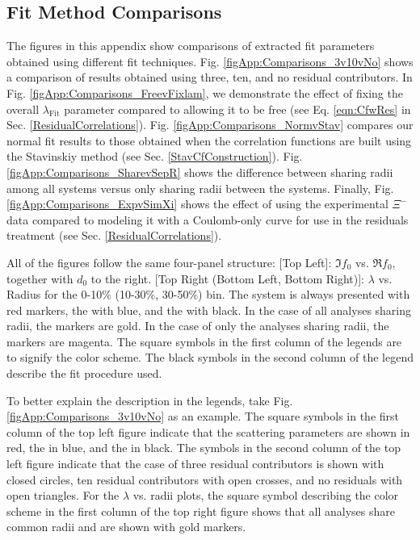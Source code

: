 \documentclass[/home/jesse/Analysis/FemtoAnalysis/AnalysisNotes/AnalysisNoteJBuxton.tex]{subfiles}
\begin{document}
\subsection{Fit Method Comparisons}
\label{App_ResultsLamK_FitMethComp}

The figures in this appendix show comparisons of extracted fit parameters obtained using different fit techniques.
Fig. \ref{figApp:Comparisons_3v10vNo} shows a comparison of results obtained using three, ten, and no residual contributors.
In Fig. \ref{figApp:Comparisons_FreevFixlam}, we demonstrate the effect of fixing the overall $\lambda_{\mathrm{Fit}}$ parameter compared to allowing it to be free (see Eq. \ref{eqn:CfwRes} in Sec. \ref{ResidualCorrelations}).
Fig. \ref{figApp:Comparisons_NormvStav} compares our normal fit results to those obtained when the correlation functions are built using the Stavinskiy method (see Sec. \ref{StavCfConstruction}).
Fig. \ref{figApp:Comparisons_SharevSepR} shows the difference between sharing radii among all \LamK systems versus only sharing radii between the \LamKpm systems.
Finally, Fig. \ref{figApp:Comparisons_ExpvSimXi} shows the effect of using the experimental $\Xi^{-}$\Kpm data compared to modeling it with a Coulomb-only curve for use in the residuals treatment (see Sec. \ref{ResidualCorrelations}).

All of the figures follow the same four-panel structure:
[Top Left]: $\Im f_{0}$ vs. $\Re f_{0}$, together with $d_{0}$ to the right.  [Top Right (Bottom Left, Bottom Right)]: $\lambda$ vs. Radius for the 0-10\% (10-30\%, 30-50\%) bin.
The \LamKchP system is always presented with red markers, the \LamKchM with blue, and the \LamKs with black.
In the case of all \LamK analyses sharing radii, the markers are gold.
In the case of only the \LamKpm analyses sharing radii, the markers are magenta.
The square symbols in the first column of the legends are to signify the color scheme.
The black symbols in the second column of the legend describe the fit procedure used.

To better explain the description in the legends, take Fig. \ref{figApp:Comparisons_3v10vNo} as an example. 
The square symbols in the first column of the top left figure indicate that the \LamKchP scattering parameters are shown in red, the \LamKchM in blue, and the \LamKs in black.
The symbols in the second column of the top left figure indicate that the case of three residual contributors is shown with closed circles, ten residual contributors with open crosses, and no residuals with open triangles.
For the $\lambda$ vs. radii plots, the square symbol describing the color scheme in the first column of the top right figure shows that all \LamK analyses share common radii and are shown with gold markers.
\end{document}
